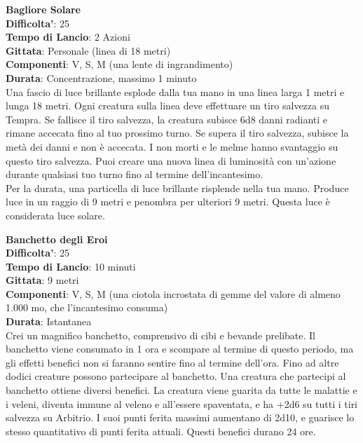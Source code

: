 \begin{multicols}{2}
\medskip\textbf{Bagliore Solare}\\
\textbf{Difficolta'}: 25\\
\textbf{Tempo di Lancio}: 2 Azioni\\
\textbf{Gittata}: Personale (linea di 18 metri)\\
\textbf{Componenti}: V, S, M (una lente di ingrandimento)\\
\textbf{Durata}: Concentrazione, massimo 1 minuto\\
Una fascio di luce brillante esplode dalla tua mano in una linea larga 1 metri e lunga 18 metri. Ogni creatura sulla linea deve effettuare un tiro salvezza su Tempra. Se fallisce il tiro salvezza, la creatura subisce 6d8 danni radianti e rimane accecata fino al tuo prossimo turno. Se supera il tiro salvezza, subisce la metà dei danni e non è accecata. I non morti e le melme hanno svantaggio su questo tiro salvezza. Puoi creare una nuova linea di luminosità con un’azione durante qualsiasi tuo turno fino al termine dell’incantesimo.\\
Per la durata, una particella di luce brillante risplende nella tua mano. Produce luce in un raggio di 9 metri e penombra per ulteriori 9 metri. Questa luce è considerata luce solare.


\medskip\textbf{Banchetto degli Eroi}\\
\textbf{Difficolta'}: 25\\
\textbf{Tempo di Lancio}: 10 minuti\\
\textbf{Gittata}: 9 metri\\
\textbf{Componenti}: V, S, M (una ciotola incrostata di gemme del valore di almeno 1.000 mo, che l’incantesimo consuma)\\
\textbf{Durata}: Istantanea\\
Crei un magnifico banchetto, comprensivo di cibi e bevande prelibate. Il banchetto viene consumato in 1 ora e scompare al termine di questo periodo, ma gli effetti benefici non si faranno sentire fino al termine dell’ora. Fino ad altre dodici creature possono
partecipare al banchetto. Una creatura che partecipi al banchetto ottiene diversi benefici. La creatura viene guarita da tutte le malattie e i veleni, diventa immune al veleno e all’essere
spaventata, e ha +2d6 su tutti i tiri salvezza su Arbitrio. I suoi punti ferita massimi aumentano di 2d10, e guarisce lo stesso quantitativo di punti ferita attuali. Questi benefici durano 24 ore. 


\end{multicols}
